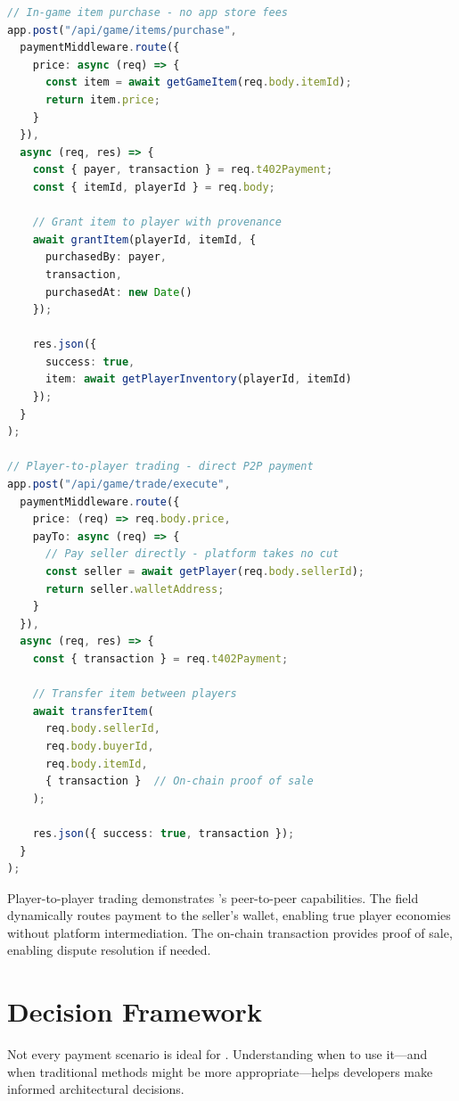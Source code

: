 \begin{lstlisting}[language=typescript,caption={Game item marketplace with direct payments}]
// In-game item purchase - no app store fees
app.post("/api/game/items/purchase",
  paymentMiddleware.route({
    price: async (req) => {
      const item = await getGameItem(req.body.itemId);
      return item.price;
    }
  }),
  async (req, res) => {
    const { payer, transaction } = req.t402Payment;
    const { itemId, playerId } = req.body;

    // Grant item to player with provenance
    await grantItem(playerId, itemId, {
      purchasedBy: payer,
      transaction,
      purchasedAt: new Date()
    });

    res.json({
      success: true,
      item: await getPlayerInventory(playerId, itemId)
    });
  }
);

// Player-to-player trading - direct P2P payment
app.post("/api/game/trade/execute",
  paymentMiddleware.route({
    price: (req) => req.body.price,
    payTo: async (req) => {
      // Pay seller directly - platform takes no cut
      const seller = await getPlayer(req.body.sellerId);
      return seller.walletAddress;
    }
  }),
  async (req, res) => {
    const { transaction } = req.t402Payment;

    // Transfer item between players
    await transferItem(
      req.body.sellerId,
      req.body.buyerId,
      req.body.itemId,
      { transaction }  // On-chain proof of sale
    );

    res.json({ success: true, transaction });
  }
);
\end{lstlisting}

Player-to-player trading demonstrates \tprotocol{}'s peer-to-peer capabilities. The  field dynamically routes payment to the seller's wallet, enabling true player economies without platform intermediation. The on-chain transaction provides proof of sale, enabling dispute resolution if needed.

\section{Decision Framework}
\label{sec:decision-framework}

Not every payment scenario is ideal for \tprotocol{}. Understanding when to use it---and when traditional methods might be more appropriate---helps developers make informed architectural decisions.

